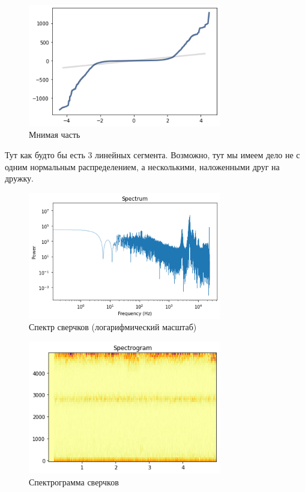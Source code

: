 \documentclass[a4paper,12pt]{report}
\begin{document}
    \begin{figure}[H]
        \centering
        \includegraphics[width=0.75\textwidth]{ex1_crickets_closer_look_3}
        \caption{Мнимая часть}
        \label{fig:ex1_crickets_closer_look_3}
    \end{figure}
    
    Тут как будто бы есть 3 линейных сегмента. Возможно, тут мы имеем дело не с одним нормальным распределением, а несколькими, наложенными друг на дружку.
    
    \begin{figure}[H]
        \centering
        \includegraphics[width=0.75\textwidth]{ex1_crickets_spectrum.png}
        \caption{Спектр сверчков (логарифмический масштаб)}
        \label{fig:ex1_crickets_spectrum}
    \end{figure}
    
    \begin{figure}[H]
        \centering
        \includegraphics[width=0.75\textwidth]{ex1_crickets_spectrogram.png}
        \caption{Спектрограмма сверчков}
        \label{fig:ex1_crickets_spectrogram}
    \end{figure}
    
\end{document}
